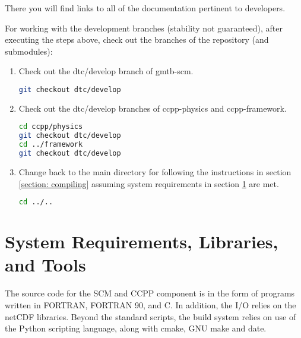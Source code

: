 There you will find links to all of the documentation pertinent to developers.

For working with the development branches (stability not guaranteed), after executing the steps above, check out the  branches of the repository (and submodules):
\begin{enumerate}
    \item Check out the dtc/develop branch of gmtb-scm.
\begin{lstlisting}[language=bash]
git checkout dtc/develop
\end{lstlisting}
\item Check out the dtc/develop branches of ccpp-physics and ccpp-framework.
\begin{lstlisting}[language=bash]
cd ccpp/physics
git checkout dtc/develop
cd ../framework
git checkout dtc/develop
\end{lstlisting}
\item Change back to the main directory for following the instructions in section \ref{section: compiling} assuming system requirements in section \ref{section: systemrequirements} are met.
\begin{lstlisting}[language=bash]
cd ../..
\end{lstlisting}
\end{enumerate}


\section{System Requirements, Libraries, and Tools}
\label{section: systemrequirements}

The source code for the SCM and CCPP component is in the form of programs written in FORTRAN, FORTRAN 90, and C. In addition, the I/O relies on the netCDF libraries. Beyond the standard scripts, the build system relies on use of the Python scripting language, along with cmake, GNU make and date.

